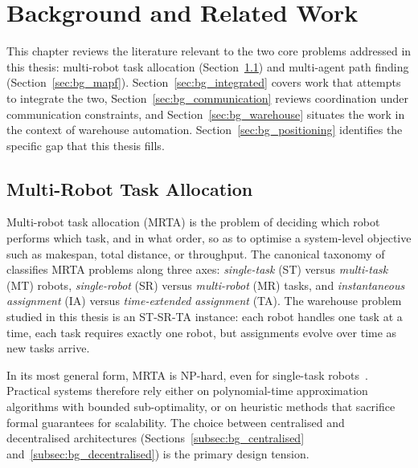 \chapter{Background and Related Work}
\label{chap:background}

This chapter reviews the literature relevant to the two core problems addressed
in this thesis: multi-robot task allocation (Section~\ref{sec:bg_mrta}) and
multi-agent path finding (Section~\ref{sec:bg_mapf}).
Section~\ref{sec:bg_integrated} covers work that attempts to integrate the two,
Section~\ref{sec:bg_communication} reviews coordination under communication
constraints, and Section~\ref{sec:bg_warehouse} situates the work in the
context of warehouse automation.
Section~\ref{sec:bg_positioning} identifies the specific gap that this thesis
fills.


\section{Multi-Robot Task Allocation}
\label{sec:bg_mrta}

Multi-robot task allocation (MRTA) is the problem of deciding which robot
performs which task, and in what order, so as to optimise a system-level
objective such as makespan, total distance, or throughput.
The canonical taxonomy of \citet{gerkey2004formal} classifies MRTA problems
along three axes: \emph{single-task} (ST) versus \emph{multi-task} (MT) robots,
\emph{single-robot} (SR) versus \emph{multi-robot} (MR) tasks, and
\emph{instantaneous assignment} (IA) versus \emph{time-extended assignment}
(TA).
The warehouse problem studied in this thesis is an ST-SR-TA instance: each
robot handles one task at a time, each task requires exactly one robot, but
assignments evolve over time as new tasks arrive.

In its most general form, MRTA is NP-hard, even for single-task
robots~\cite{gerkey2004formal}.
Practical systems therefore rely either on polynomial-time approximation
algorithms with bounded sub-optimality, or on heuristic methods that sacrifice
formal guarantees for scalability.
The choice between centralised and decentralised architectures
(Sections~\ref{subsec:bg_centralised} and~\ref{subsec:bg_decentralised})
is the primary design tension.


